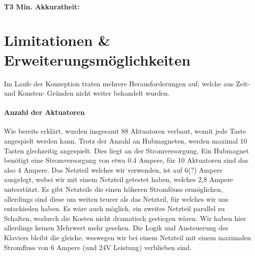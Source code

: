 \paragraph{T3 Min. Akkuratheit:}










\section{Limitationen \& Erweiterungsmöglichkeiten} \label{ergebnisse-limitationen}


Im Laufe der Konzeption traten mehrere Herausforderungen auf, welche aus Zeit- und Konsten- Gründen nicht weiter
behandelt wurden.
\paragraph{Anzahl der Aktuatoren}
Wie bereits erklärt, wurden insgesamt 88 Aktuatoren verbaut, womit jede Taste angespielt werden kann. Trotz der Anzahl an
Hubmagneten, werden maximal 10 Tasten glechzeitig angespielt. Dies liegt an der Stromversorgung. Ein Hubmagnet benötigt
eine Stromversorgung von etwa 0.4 Ampere, für 10 Aktuatoren sind das also 4 Ampere. Das Netzteil welches wir verwenden, ist auf
6(?) Ampere ausgelegt, wobei wir mit einem Netzteil getestet haben, welches 2,8 Ampere unterstützt. Es gibt Netzteile die
einen höheren Stromföuss ermöglichen, allerdings sind diese um weiten teurer als das Netzteil, für welches wir uns entschieden haben.
Es wäre auch möglich, ein zweites Netzteil parallel zu Schalten, wodurch die Kosten nicht dramatisch gestiegen wären.
Wir haben hier allerdings keinen Mehrwert mehr gesehen. Die Logik und Ansteuerung des Klaviers bleibt die gleiche, weswegen
wir bei einem Netzteil mit einem maximalen Stromfluss von 6 Ampere (und 24V Leistung) verblieben sind.

